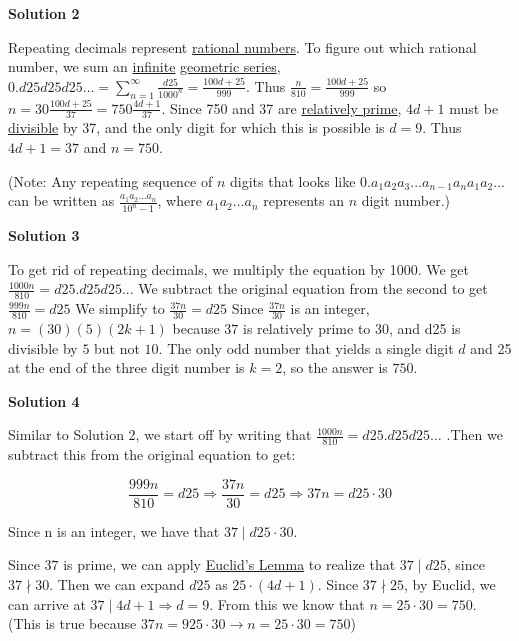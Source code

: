 \begin{enumerate}
\textbf{Solution 2}

Repeating decimals represent \href{https://artofproblemsolving.com/wiki/index.php?title=Rational\_number}{rational numbers}.  To figure out which rational number, we sum an \href{https://artofproblemsolving.com/wiki/index.php?title=Infinite}{infinite} \href{https://artofproblemsolving.com/wiki/index.php?title=Geometric\_series}{geometric series}, $0.d25d25d25\ldots = \sum_{n = 1}^\infty \frac{d25}{1000^n} = \frac{100d + 25}{999}$.  Thus $\frac{n}{810} = \frac{100d + 25}{999}$ so $n = 30\frac{100d + 25}{37} =750\frac{4d + 1}{37}$.  Since 750 and 37 are \href{https://artofproblemsolving.com/wiki/index.php?title=Relatively\_prime}{relatively prime}, $4d + 1$ must be \href{https://artofproblemsolving.com/wiki/index.php?title=Divisible}{divisible} by 37, and the only digit for which this is possible is $d = 9$.  Thus $4d + 1 = 37$ and $n = \boxed{750}$.

 
(Note: Any repeating sequence of $n$ digits that looks like $0.a_1a_2a_3...a_{n-1}a_na_1a_2...$ can be written as $\frac{a_1a_2...a_n}{10^n-1}$, where $a_1a_2...a_n$ represents an $n$ digit number.)

 



\textbf{Solution 3}

To get rid of repeating decimals, we multiply the equation by 1000. We get $\frac{1000n}{810} = d25.d25d25...$ We subtract the original equation from the second to get $\frac{999n}{810}=d25$ We simplify to $\frac{37n}{30} = d25$ Since $\frac{37n}{30}$ is an integer, $n=(30)(5)(2k+1)$ because $37$ is relatively prime to $30$, and d25 is divisible by $5$ but not $10$. The only odd number that yields a single digit $d$ and 25 at the end of the three digit number is $k=2$, so the answer is $\boxed{750}$.

 



\textbf{Solution 4}

Similar to Solution 2, we start off by writing that $\frac{1000n}{810} = d25.d25d25 \dots$ .Then we subtract this from the original equation to get:

 
 \[\frac{999n}{810} =d25 \Longrightarrow \frac{37n}{30} = d25 \Longrightarrow 37n = d25 \cdot 30\]

 Since n is an integer, we have that $37 \mid d25 \cdot 30$.

 Since $37$ is prime, we can apply \href{https://artofproblemsolving.com/wiki/index.php?title=Euclid\%27s\_Lemma}{Euclid's Lemma} to realize that $37 \mid d25$, since $37 \nmid 30$. Then we can expand $d25$ as $25 \cdot (4d +1)$. Since $37 \nmid 25$, by Euclid, we can arrive at $37 \mid 4d+1 \Longrightarrow d=9$. From this we know that $n= 25 \cdot 30 = \boxed{750}$. (This is true because $37n = 925 \cdot 30 \rightarrow n= 25 \cdot 30 = 750$)


\end{enumerate}
